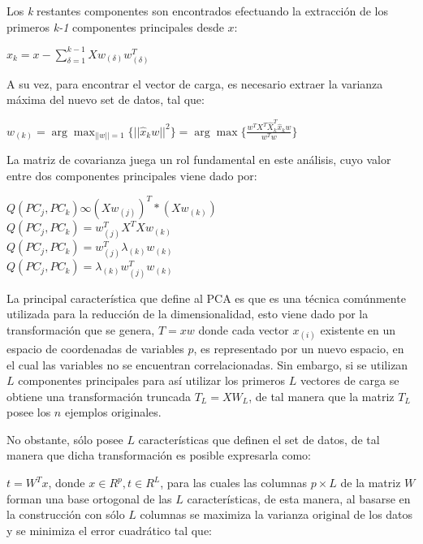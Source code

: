 Los \textit{k} restantes componentes son encontrados efectuando la extracción de los primeros \textit{k-1} componentes principales desde $x$:

\begin{center}
	$\hat{x}_{k} = x - \sum_{\delta=1}^{k-1}Xw_{(\delta)}w^{T}_{(\delta)}$
\end{center}

A su vez, para encontrar el vector de carga, es necesario extraer la varianza máxima del nuevo set de datos, tal que:

\begin{center}
	$w_{(k)} = \arg \max_{||w||=1} \{||\hat{x}_{k}w||^{2}\} = \arg \max \{\frac{w^{T}X^{T}\hat{X}^{T}_{k}\hat{x}_{k}w}{w^{T}w}\}$
\end{center}

La matriz de covarianza juega un rol fundamental en este análisis, cuyo valor entre dos componentes principales viene dado por:
\begin{center}
	$Q(PC_{j}, PC_{k}) \infty (Xw_{(j)})^{T} * (Xw_{(k)})$\\
	$Q(PC_{j}, PC_{k}) = w_{(j)}^{T}X^{T}Xw_{(k)}$\\
	$Q(PC_{j}, PC_{k}) = w_{(j)}^{T}\lambda_{(k)}w_{(k)}$\\
	$Q(PC_{j}, PC_{k}) = \lambda_{(k)}w_{(j)}^{T}w_{(k)}$	
\end{center}


La principal característica que define al PCA es que es una técnica comúnmente utilizada para la reducción de la dimensionalidad, esto viene dado por la transformación que se genera, $ T = xw $ donde cada vector $ x_{(i)} $ existente en un espacio de coordenadas de variables $p$, es representado por un nuevo espacio, en el cual las variables no se encuentran correlacionadas. Sin embargo, si se utilizan $ L $ componentes principales para así utilizar los primeros $ L $ vectores de carga se obtiene una transformación truncada $ T_{L} = XW_{L} $, de tal manera que la matriz $ T_{L} $ posee los $n$ ejemplos originales. 

No obstante, sólo posee $ L $ características que definen el set de datos, de tal manera que dicha transformación es posible expresarla como:

$ t = W^{T}x$, donde $ x \in R^{p}, t \in R^{L}$, para las cuales las columnas $ p \times L $ de la matriz $ W $ forman una base ortogonal de las $ L $ características, de esta manera, al basarse en la construcción con sólo $ L $ columnas se maximiza la varianza original de los datos y se minimiza el error cuadrático tal que: 

